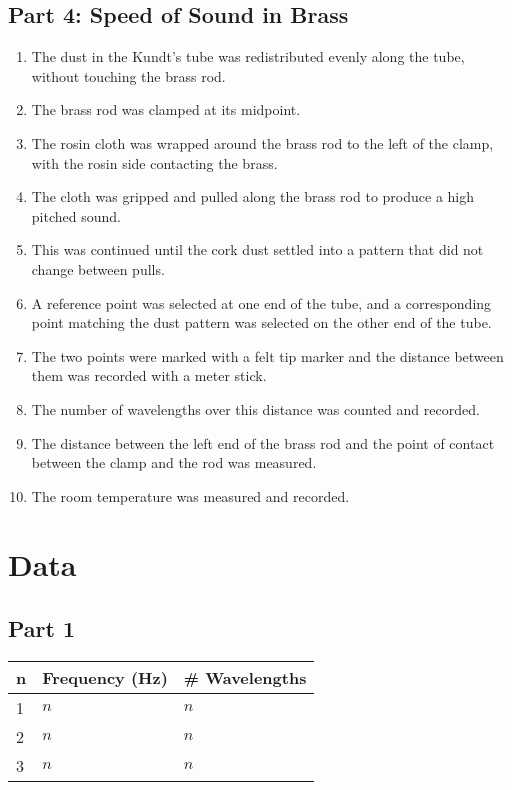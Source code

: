 \documentclass[twocolumn,english]{IEEEtran}
\theoremstyle{plain}
\theoremstyle{plain}
\begin{document}
\subsection*{Part 4: Speed of Sound in Brass}
\begin{enumerate}
 \item The dust in the Kundt's tube was redistributed evenly along the tube, without touching the brass rod.
 \item The brass rod was clamped at its midpoint. %
 \item The rosin cloth was wrapped around the brass rod to the left of the clamp, with the rosin side contacting the brass.
 \item The cloth was gripped and pulled along the brass rod to produce a high pitched sound.
 \item This was continued until the cork dust settled into a pattern that did not change between pulls.
 \item A reference point was selected at one end of the tube, and a corresponding point matching the dust pattern was selected on the other end of the tube.
 \item The two points were marked with a felt tip marker and the distance between them was recorded with a meter stick.
 \item The number of wavelengths over this distance was counted and recorded.
 \item The distance between the left end of the brass rod and the point of contact between the clamp and the rod was measured.
 \item The room temperature was measured and recorded.
\end{enumerate}


\section{Data}
  \subsection*{\textbf{Part 1}}
  \begin{table}[h]
  \centering{}
  \begin{tabular}{|l|l|l|}
  \hline
  n & Frequency (Hz) 	& \# Wavelengths 	\\ \hline
  1 & $n$               & $n$                	\\ \hline
  2 & $n$               & $n$               	\\ \hline
  3 & $n$               & $n$              	\\ \hline
  \end{tabular}
  \end{table}
\end{document}
